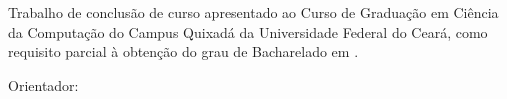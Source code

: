 

\begin{titlepage}
    \centering %

    {\MakeUppercase{\autor} \par}
    \vspace{4cm} %

    {\titulodtcc \par} %
    \vspace{0.5cm} %
    {\subtitulo \par} %
    \vspace{2.5cm} %

    \begin{flushright}
        \begin{minipage}{0.5\textwidth} %
            \begin{flushleft} %
                \justifying
                \singlespacing %


                Trabalho de conclusão de curso apresentado ao Curso de Graduação em Ciência da Computação do Campus Quixadá da Universidade Federal do Ceará, como requisito parcial à obtenção do grau de Bacharelado em \curso.
                \vspace{1cm} %

                \noindent Orientador: \orientador \par %

            \end{flushleft}
        \end{minipage}
    \end{flushright}
    \vfill


    \MakeUppercase{\local} \par
    \data

\end{titlepage}